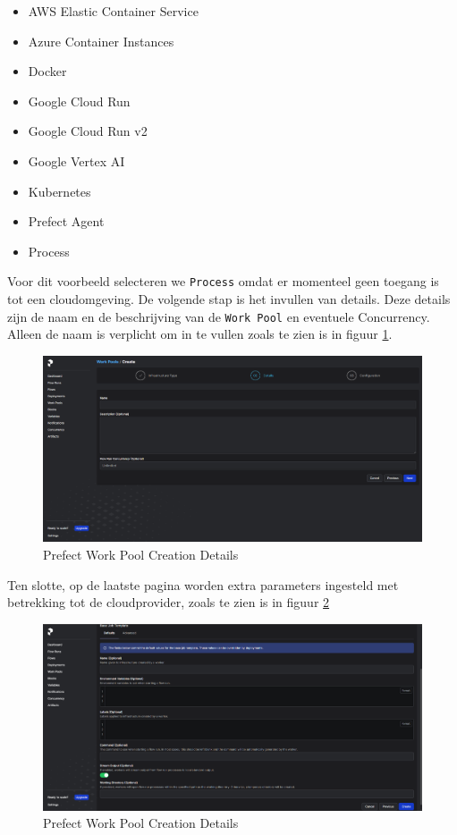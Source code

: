 \begin{itemize}
    \item AWS Elastic Container Service
    \item Azure Container Instances
    \item Docker
    \item Google Cloud Run
    \item Google Cloud Run v2
    \item Google Vertex AI
    \item Kubernetes
    \item Prefect Agent 
    \item Process
\end{itemize}
Voor dit voorbeeld selecteren we \verb+Process+ omdat er momenteel geen toegang is tot een cloudomgeving. De volgende stap is het invullen van details. Deze details zijn de naam en de beschrijving van de \verb+Work Pool+ en eventuele Concurrency. Alleen de naam is verplicht om in te vullen zoals te zien is in figuur \ref{fig:Prefect_Work_Pools_Create_Details}.
\begin{figure}[htbp]
    \centering
    \includegraphics[width=0.9\linewidth]{graphics/Prefect_Work_Pools_Create_Details.PNG}
    \caption{Prefect Work Pool Creation Details}
    \label{fig:Prefect_Work_Pools_Create_Details}
\end{figure}
Ten slotte, op de laatste pagina worden extra parameters ingesteld met betrekking tot de cloudprovider, zoals te zien is in figuur \ref{fig:Prefect_Work_Pools_Create_parameters}
\begin{figure}[htbp]
    \centering
    \includegraphics[width=0.9\linewidth]{graphics/Prefect_Work_Pools_Create_Parameters.PNG}
    \caption{Prefect Work Pool Creation Details}
    \label{fig:Prefect_Work_Pools_Create_parameters}
\end{figure}
